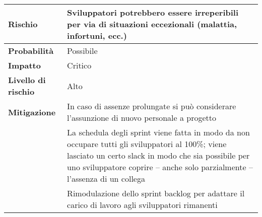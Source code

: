 \begin{table}[H]
  \begin{tabularx}{\textwidth}{lX}
    \toprule
    \textbf{Rischio}            & \textbf{Sviluppatori potrebbero essere irreperibili per via di situazioni eccezionali (malattia, infortuni, ecc.)}                                                                                                                       \\
    \midrule
    \textbf{Probabilità}        & Possibile                                                                                                                                                                                                                                \\
    \textbf{Impatto}            & Critico                                                                                                                                                                                                                                  \\
    \textbf{Livello di rischio} & Alto                                                                                                                                                                                                                                     \\
    \textbf{Mitigazione}        & In caso di assenze prolungate si può considerare l'assunzione di nuovo personale a progetto                                                                                                                                              \\
                                & La schedula degli sprint viene fatta in modo da non occupare tutti gli sviluppatori al 100\%; viene lasciato un certo slack in modo che sia possibile per uno sviluppatore coprire -- anche solo parzialmente -- l'assenza di un collega \\
                                & Rimodulazione dello sprint backlog per adattare il carico di lavoro agli sviluppatori rimanenti                                                                                                                                          \\
    \bottomrule
  \end{tabularx}
\end{table}

